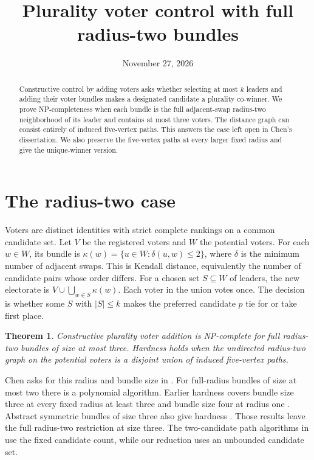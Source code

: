 \documentclass[11pt,a4paper]{amsart}
\title{Plurality voter control with full radius-two bundles}
\date{November 27, 2026}
\newtheorem{theorem}{Theorem}
\begin{document}
\begin{abstract}
Constructive control by adding voters asks whether selecting at most \(k\) leaders and adding their voter bundles makes a designated candidate a plurality co-winner. We prove NP-completeness when each bundle is the full adjacent-swap radius-two neighborhood of its leader and contains at most three voters. The distance graph can consist entirely of induced five-vertex paths. This answers the case left open in Chen's dissertation. We also preserve the five-vertex paths at every larger fixed radius and give the unique-winner version.
\end{abstract}
\maketitle

\section{The radius-two case}

Voters are distinct identities with strict complete rankings on a common candidate set. Let \(V\) be the registered voters and \(W\) the potential voters. For each \(w\in W\), its bundle is \(\kappa(w)=\{u\in W:\delta(u,w)\le2\}\), where \(\delta\) is the minimum number of adjacent swaps. This is Kendall distance, equivalently the number of candidate pairs whose order differs. For a chosen set \(S\subseteq W\) of leaders, the new electorate is \(V\cup\bigcup_{w\in S}\kappa(w)\). Each voter in the union votes once. The decision is whether some \(S\) with \(|S|\le k\) makes the preferred candidate \(p\) tie for or take first place.

\begin{theorem}\label{radius2}
Constructive plurality voter addition is NP-complete for full radius-two bundles of size at most three. Hardness holds when the undirected radius-two graph on the potential voters is a disjoint union of induced five-vertex paths.
\end{theorem}

Chen asks for this radius and bundle size in \cite[\S6.8, p.~149]{chen}. For full-radius bundles of size at most two there is a polynomial algorithm. Earlier hardness covers bundle size three at every fixed radius at least three and bundle size four at radius one \cite[\S6.6]{chen}\cite[Thms.~6--8]{bcfnt}. Abstract symmetric bundles of size three also give hardness \cite[\S4]{kellerhals}. Those results leave the full radius-two restriction at size three. The two-candidate path algorithms in \cite[\S4]{kellerhals} use the fixed candidate count, while our reduction uses an unbounded candidate set.
\end{document}
